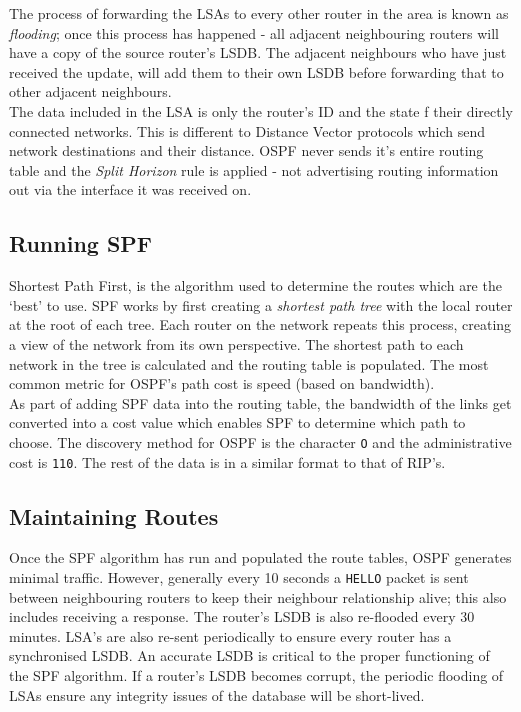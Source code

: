 The process of forwarding the LSAs to every other router in the area is known as \textit{flooding}; once this process has happened - all adjacent neighbouring routers will have a copy of the source router's LSDB. The adjacent neighbours who have just received the update, will add them to their own LSDB before forwarding that to other adjacent neighbours.\\

The data included in the LSA is only the router's ID and the state f their directly connected networks. This is different to Distance Vector protocols which send network destinations and their distance. OSPF never sends it's entire routing table and the \textit{Split Horizon} rule is applied - not advertising routing information out via the interface it was received on.

\subsection{Running SPF}
Shortest Path First, is the algorithm used to determine the routes which are the `best' to use. SPF works by first creating a \textit{shortest path tree} with the local router at the root of each tree. Each router on the network repeats this process, creating a view of the network from its own perspective. The shortest path to each network in the tree is calculated and the routing table is populated. The most common metric for OSPF's path cost is speed (based on bandwidth).\\

As part of adding SPF data into the routing table, the bandwidth of the links get converted into a cost value which enables SPF to determine which path to choose. The discovery method for OSPF is the character \verb|O| and the administrative cost is \verb|110|. The rest of the data is in a similar format to that of RIP's. 

\subsection{Maintaining Routes}
Once the SPF algorithm has run and populated the route tables, OSPF generates minimal traffic. However, generally every 10 seconds a \verb|HELLO| packet is sent between neighbouring routers to keep their neighbour relationship alive; this also includes receiving a response. The router's LSDB is also re-flooded every 30 minutes. LSA's are also re-sent periodically to ensure every router has a synchronised LSDB. An accurate LSDB is critical to the proper functioning of the SPF algorithm. If a router's LSDB becomes corrupt, the periodic flooding of LSAs ensure any integrity issues of the database will be short-lived.

